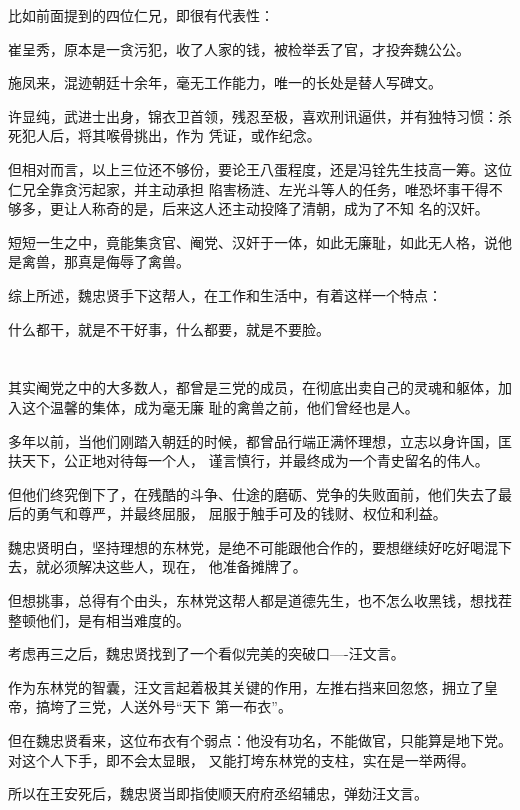 \documentclass[11pt,a4paper,onecolumn]{article}
\begin{document}
比如前面提到的四位仁兄，即很有代表性：

崔呈秀，原本是一贪污犯，收了人家的钱，被检举丢了官，才投奔魏公公。

施凤来，混迹朝廷十余年，毫无工作能力，唯一的长处是替人写碑文。

许显纯，武进士出身，锦衣卫首领，残忍至极，喜欢刑讯逼供，并有独特习惯：杀死犯人后，将其喉骨挑出，作为
凭证，或作纪念。

但相对而言，以上三位还不够份，要论王八蛋程度，还是冯铨先生技高一筹。这位仁兄全靠贪污起家，并主动承担
陷害杨涟、左光斗等人的任务，唯恐坏事干得不够多，更让人称奇的是，后来这人还主动投降了清朝，成为了不知
名的汉奸。

短短一生之中，竟能集贪官、阉党、汉奸于一体，如此无廉耻，如此无人格，说他是禽兽，那真是侮辱了禽兽。

综上所述，魏忠贤手下这帮人，在工作和生活中，有着这样一个特点：

什么都干，就是不干好事，什么都要，就是不要脸。

\section[\thesection]{}

其实阉党之中的大多数人，都曾是三党的成员，在彻底出卖自己的灵魂和躯体，加入这个温馨的集体，成为毫无廉
耻的禽兽之前，他们曾经也是人。

多年以前，当他们刚踏入朝廷的时候，都曾品行端正满怀理想，立志以身许国，匡扶天下，公正地对待每一个人，
谨言慎行，并最终成为一个青史留名的伟人。

但他们终究倒下了，在残酷的斗争、仕途的磨砺、党争的失败面前，他们失去了最后的勇气和尊严，并最终屈服，
屈服于触手可及的钱财、权位和利益。

魏忠贤明白，坚持理想的东林党，是绝不可能跟他合作的，要想继续好吃好喝混下去，就必须解决这些人，现在，
他准备摊牌了。

但想挑事，总得有个由头，东林党这帮人都是道德先生，也不怎么收黑钱，想找茬整顿他们，是有相当难度的。

考虑再三之后，魏忠贤找到了一个看似完美的突破口----汪文言。

作为东林党的智囊，汪文言起着极其关键的作用，左推右挡来回忽悠，拥立了皇帝，搞垮了三党，人送外号``天下
第一布衣''。

但在魏忠贤看来，这位布衣有个弱点：他没有功名，不能做官，只能算是地下党。对这个人下手，即不会太显眼，
又能打垮东林党的支柱，实在是一举两得。

所以在王安死后，魏忠贤当即指使顺天府府丞绍辅忠，弹劾汪文言。
\end{document}
